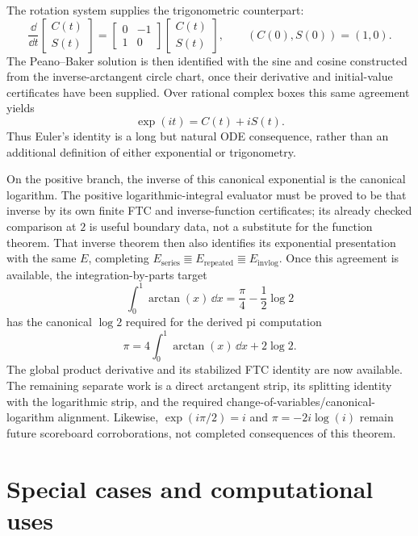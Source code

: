 \begin{theorem}
The rotation system supplies the trigonometric counterpart:
\[
 \frac{\dd}{\dd t}
 \begin{bmatrix}C(t)\\S(t)\end{bmatrix}
 =
 \begin{bmatrix}0&-1\\1&0\end{bmatrix}
 \begin{bmatrix}C(t)\\S(t)\end{bmatrix},
 \qquad
 (C(0),S(0))=(1,0).
\]
The Peano--Baker solution is then identified with the sine and cosine
constructed from the inverse-arctangent circle chart, once their
derivative and initial-value certificates have been supplied.  Over rational
complex boxes this same agreement yields
\[
 \exp(it)=C(t)+iS(t).
\]
Thus Euler's identity is a long but natural ODE consequence, rather than an
additional definition of either exponential or trigonometry.

On the positive branch, the inverse of this canonical exponential is the
canonical logarithm.  The positive logarithmic-integral evaluator must be
proved to be that inverse by its own finite FTC and inverse-function
certificates; its already checked comparison at \(2\) is useful boundary
data, not a substitute for the function theorem.  That inverse theorem then
also identifies its exponential presentation with the same \(E\), completing
\(E_{\mathrm{series}}\Equiv E_{\mathrm{repeated}}\Equiv
E_{\mathrm{invlog}}\).  Once this agreement is available, the
integration-by-parts target
\[
 \int_0^1\arctan(x)\,\dd x
 =\frac{\pi}{4}-\frac12\log 2
\]
has the canonical \(\log 2\) required for the derived pi computation
\[
 \pi=4\int_0^1\arctan(x)\,\dd x+2\log2.
\]
The global product derivative and its stabilized FTC identity are now
available.  The remaining separate work is a direct arctangent strip,
its splitting identity with the logarithmic strip, and the required
change-of-variables/canonical-logarithm alignment.  Likewise,
\(\exp(i\pi/2)=i\) and \(\pi=-2i\log(i)\) remain future scoreboard
corroborations, not completed consequences of this theorem.
\end{theorem}

\section{Special cases and computational uses}

